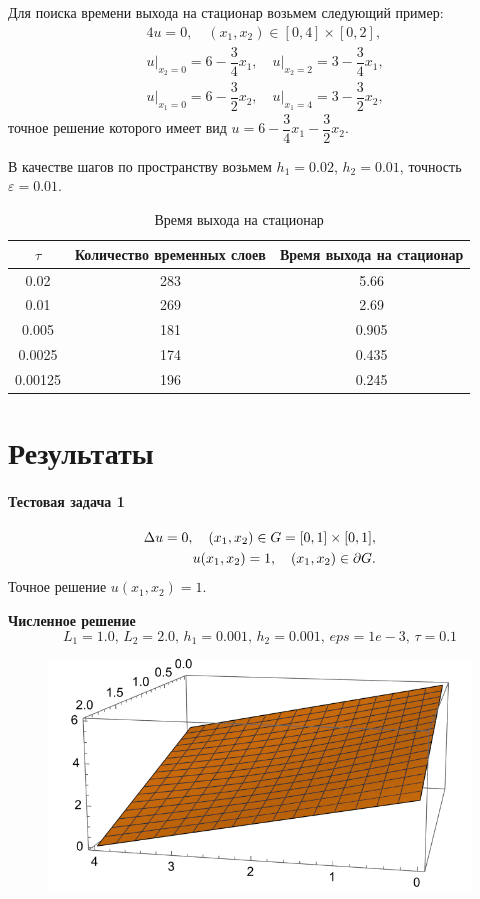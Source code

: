 \documentclass[12pt, a4paper]{article}
\begin{document}
\begin{enumerate}
		Для поиска времени выхода на стационар возьмем следующий пример:
		\begin{eqnarray*}
			& \mathcal{4}u = 0, \quad (x_1, x_2) \in [0, 4]\times [0, 2],\\
			& u\Big|_{x_2 = 0} = 6 - \dfrac34 x_1, \quad u\Big|_{x_2 = 2} = 3 - \dfrac34 x_1,\\
			& u\Big|_{x_1 = 0} = 6 - \dfrac32 x_2, \quad u\Big|_{x_1 = 4} = 3 - \dfrac32 x_2,
		\end{eqnarray*}
		точное решение которого имеет вид $u = 6 - \dfrac34 x_1 - \dfrac32 x_2$.
		
		В качестве шагов по пространству возьмем $h_1 = 0.02$, $h_2 = 0.01$, точность $\varepsilon = 0.01$.
		
		\begin{table}[H]
			\caption{Время выхода на стационар}
			\centering
			\begin{tabular}{|c|c|c|}\hline
				$\tau$ & Количество временных слоев & Время выхода на стационар\\ 
				\hline
				0.02 & 283 & 5.66 \\
				\hline
				0.01 & 269 & 2.69 \\
				\hline
				0.005 & 181 & 0.905 \\
				\hline
				0.0025 & 174 & 0.435 \\
				\hline
				0.00125 & 196 & 0.245 \\
				\hline
			\end{tabular}
		\end{table}
		
	\end{enumerate}
	
	\newpage
	\section{Результаты}
	\paragraph{Тестовая задача 1}
	\begin{eqnarray*}
		\Delta u=0,\quad(x_1,x_2)\in G=[0,1]\times[0,1],\\
		u(x_1,x_2)=1,\quad (x_1,x_2)\in \partial G.
	\end{eqnarray*}
		Точное решение $u(x_1,x_2)=1$.
		
		\textbf{Численное решение} $$L_1=1.0,\,L_2=2.0,\,h_1=0.001,\,h_2=0.001,\,eps=1e-3,\,\tau=0.1$$
			\begin{figure}[H]
			\centering
			\includegraphics[width=0.7\linewidth]{test1.png}
		\end{figure}
\end{document}
